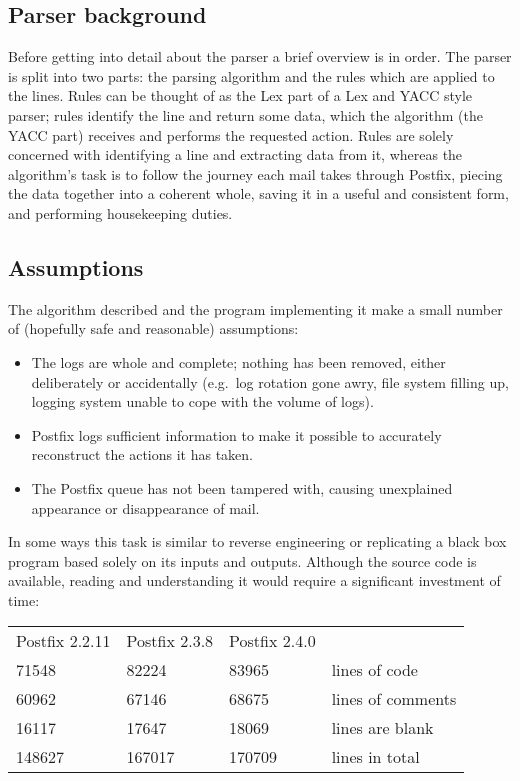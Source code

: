 \documentclass[a4paper,12pt,draft]{article}
\begin{document}
\subsection{Parser background}

Before getting into detail about the parser a brief overview is in order.
The parser is split into two parts: the parsing algorithm and the rules
which are applied to the lines.  Rules can be thought of as the Lex part of
a Lex and YACC style parser; rules identify the line and return some data,
which the algorithm (the YACC part) receives and performs the requested
action.  Rules are solely concerned with identifying a line and extracting
data from it, whereas the algorithm's task is to follow the journey each
mail takes through Postfix, piecing the data together into a coherent
whole, saving it in a useful and consistent form, and performing
housekeeping duties.


\subsection{Assumptions}

The algorithm described and the program implementing it make a small number
of (hopefully safe and reasonable) assumptions:

\begin{itemize}

    \item The logs are whole and complete; nothing has been removed, either
        deliberately or accidentally (e.g.\ log rotation gone awry, file
        system filling up, logging system unable to cope with the volume of
        logs).

    \item Postfix logs sufficient information to make it possible to
        accurately reconstruct the actions it has taken.

    \item The Postfix queue has not been tampered with, causing unexplained
        appearance or disappearance of mail.

\end{itemize}

In some ways this task is similar to reverse engineering or replicating a
black box program based solely on its inputs and outputs.  Although the
source code is available, reading and understanding it would require a
significant investment of time:

\begin{tabular}[]{llll}

    Postfix 2.2.11  & Postfix 2.3.8   & Postfix 2.4.0 &                   \\
    71548           & 82224           & 83965         & lines of code     \\
    60962           & 67146           & 68675         & lines of comments \\
    16117           & 17647           & 18069         & lines are blank   \\
    148627          & 167017          & 170709        & lines in total    \\

\end{tabular}
\end{document}
